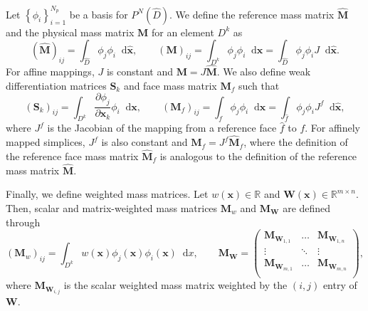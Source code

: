 \documentclass{siamart0216}
\newcommand{\pd}[2]{\frac{\partial#1}{\partial#2}}
\newcommand{\LRp}[1]{\left( #1 \right)}
\newcommand{\LRc}[1]{\left\{ #1 \right\}}
\newcommand*\diff[1]{\mathop{}\!{\mathrm{d}#1}}
\begin{document}
Let $\LRc{\phi_i}_{i=1}^{N_p}$ be a basis for $P^N\LRp{\widehat{D}}$.  We define the reference mass matrix $\widehat{\bm{M}}$ and the physical mass matrix $\bm{M}$ for an element $D^k$ as
\[
\LRp{\widehat{\bm{M}}}_{ij} = \int_{\widehat{D}}\phi_j\phi_i \diff{\widehat{\bm{x}}}, \qquad \LRp{\bm{M}}_{ij} = \int_{D^k} \phi_j\phi_i \diff{\bm{x}} = \int_{\widehat{D}}\phi_j\phi_i J\diff{ \widehat{\bm{x}}}.
\]
For affine mappings, $J$ is constant and $\bm{M} = J\widehat{\bm{M}}$.  We also define weak differentiation matrices $\bm{S}_{k}$ and face mass matrix $\bm{M}_f$ such that
\[
\LRp{\bm{S}_{k}}_{ij} =  \int_{D^k} \pd{\phi_j}{\bm{x}_k}\phi_i \diff{\bm{x}}, \qquad \LRp{\bm{M}_{f}}_{ij} =  \int_{f} \phi_j \phi_i \diff{\bm{x}} = \int_{\widehat{f}} \phi_j \phi_i J^f\diff{\widehat{\bm{x}}},
\]
where $J^f$ is the Jacobian of the mapping from a reference face $\widehat{f}$ to $f$.  For affinely mapped simplices, $J^f$ is also constant and $\bm{M}_f = J^f \widehat{\bm{M}}_f$, where the definition of the reference face mass matrix $\widehat{\bm{M}}_f$ is analogous to the definition of the reference mass matrix $\widehat{\bm{M}}$.

Finally, we define weighted mass matrices.  Let $w(\bm{x})\in \mathbb{R}$ and $\bm{W}(\bm{x})\in \mathbb{R}^{m\times n}$.  Then, scalar and matrix-weighted mass matrices $\bm{M}_w$ and $\bm{M}_{\bm{W}}$ are defined through
\[
\LRp{\bm{M}_w}_{ij} = \int_{D^k} w(\bm{x}) \phi_j(\bm{x})  \phi_i(\bm{x}) \diff x, \qquad \bm{M}_{\bm{W}} = \LRp{\begin{array}{ccc}
\bm{M}_{\bm{W}_{1,1}}& \ldots & \bm{M}_{\bm{W}_{1,n}}\\
\vdots & \ddots & \vdots\\
\bm{M}_{\bm{W}_{m,1}} & \ldots & \bm{M}_{\bm{W}_{m,n}}\\
\end{array}},
\]
where $\bm{M}_{\bm{W}_{i,j}}$ is the scalar weighted mass matrix weighted by the $(i,j)$ entry of $\bm{W}$. 
\end{document}

